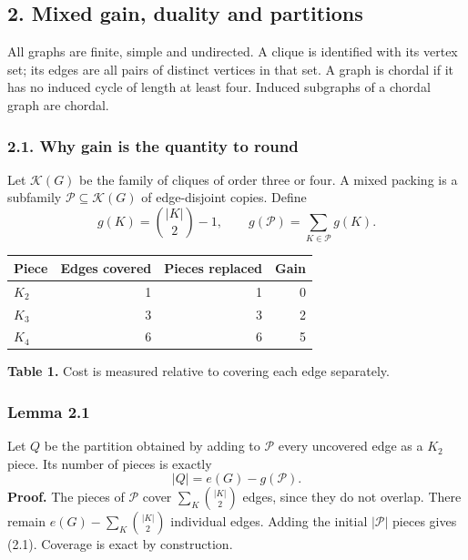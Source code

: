 \documentclass[english,11pt,a4paper]{article}
\newcounter{none}
\begin{document}
\subsection{2. Mixed gain, duality and partitions}\label{mixed-gain-duality-and-partitions}

All graphs are finite, simple and undirected. A clique is identified with its vertex set; its edges are all pairs of distinct vertices in that set. A graph is chordal if it has no induced cycle of length at least four. Induced subgraphs of a chordal graph are chordal.

\subsubsection{2.1. Why gain is the quantity to round}\label{why-gain-is-the-quantity-to-round}

Let \(\mathcal K(G)\) be the family of cliques of order three or four. A mixed packing is a subfamily \(\mathcal P\subseteq\mathcal K(G)\) of edge-disjoint copies. Define \[
g(K)=\binom{|K|}{2}-1,\qquad
g(\mathcal P)=\sum_{K\in\mathcal P}g(K).
\]


{\def\LTcaptype{none} %
\begin{longtable}[c]{@{}lrrr@{}}
\toprule\noalign{}
Piece & Edges covered & Pieces replaced & Gain \\
\midrule\noalign{}
\endhead
\bottomrule\noalign{}
\endlastfoot
\(K_2\) & 1 & 1 & 0 \\
\(K_3\) & 3 & 3 & 2 \\
\(K_4\) & 6 & 6 & 5 \\
\end{longtable}
}

\textbf{Table 1.} Cost is measured relative to covering each edge separately.

\subsubsection{Lemma 2.1}\label{lemma-2.1}

Let \(Q\) be the partition obtained by adding to \(\mathcal P\) every uncovered edge as a \(K_2\) piece. Its number of pieces is exactly \[
|Q|=e(G)-g(\mathcal P).
\tag{2.1}
\] \textbf{Proof.} The pieces of \(\mathcal P\) cover \(\sum_K\binom{|K|}{2}\) edges, since they do not overlap. There remain \(e(G)-\sum_K\binom{|K|}{2}\) individual edges. Adding the initial \(|\mathcal P|\) pieces gives (2.1). Coverage is exact by construction.
\end{document}
